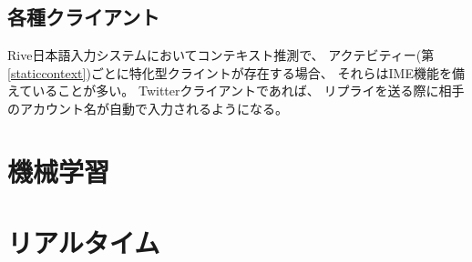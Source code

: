 \subsection{各種クライアント}
Rive日本語入力システムにおいてコンテキスト推測で、
アクテビティー(第\ref{staticcontext})ごとに特化型クライントが存在する場合、
それらはIME機能を備えていることが多い。
Twitter\cite{twitter}クライアントであれば、
リプライを送る際に相手のアカウント名が自動で入力されるようになる。

\section{機械学習}

\section{リアルタイム}


